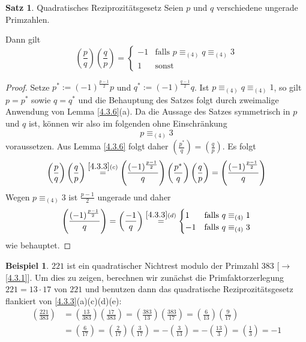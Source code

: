 \documentclass[
twoside=semi,
fontsize=12,
DIV=12, 
cleardoublepage=current,
leqno,
headings=optiontoheadandtoc, 
toc=idx
]{scrbook}
\newcommand{\brac}[1]{\left( #1 \right)}
\newcommand{\legendre}[2]{\brac{\frac{#1}{#2}}}
\theoremstyle{definition}
\newtheorem{beispiel}[definition]{Beispiel}
\newtheorem{satz}[definition]{Satz}
\begin{document}
 	\begin{satz}\label{4.3.7} Quadratisches Reziprozit\"atsgesetz\newline
 		Seien $p$ und $q$ verschiedene ungerade Primzahlen.
 		
 		\medskip\noindent
 		Dann gilt 
 		\[\legendre{p}{q}\legendre{q}{p} = 
 		\begin{cases}
 			-1 & \textrm{falls } p \equiv_{(4)} q \equiv_{(4)} 3\\
 			1 & \textrm{sonst}
 		\end{cases}\]
 		
 		\begin{proof}
 			Setze $p^* := (-1)^{\frac{p-1}{2}} p$ und $q^* := (-1)^{\frac{q-1}{2}}q$. Ist $p \equiv_{(4)} q \equiv_{(4)} 1$, so gilt $p = p^*$ sowie $q = q^*$ und die Behauptung
 			des Satzes folgt durch zweimalige Anwendung von Lemma \ref{4.3.6}(a). Da die Aussage des Satzes symmetrisch in $p$ und $q$ ist, k\"onnen wir also im folgenden ohne Einschr\"ankung
 				\[p \equiv_{(4)} 3\]
 			voraussetzen. Aus Lemma \ref{4.3.6} folgt daher $\displaystyle \legendre{p^*}{q} = \legendre{q}{p}$. Es folgt
 				\[\legendre{p}{q}\legendre{q}{p} \overset{\ref{4.3.3}(c)}{=} \legendre{(-1)^{\frac{p-1}{2}}}{q}\legendre{p^*}{q}\legendre{q}{p} = \legendre{(-1)^{\frac{p-1}{2}}}{q}\]
 			Wegen $p \equiv_{(4)} 3$ ist $\frac{p-1}{2}$ ungerade und daher 
 				\[\legendre{(-1)^{\frac{p-1}{2}}}{q} = \legendre{-1}{q} \overset{\ref{4.3.3}(d)}{=} 
 				\begin{cases}
 					1 & \textrm{falls } q \equiv_{(4)} 1\\
 					-1& \textrm{falls } q \equiv_{(4)} 3
 				\end{cases}\]
 			wie behauptet.
 		\end{proof}
 	\end{satz}
 
 	\begin{beispiel}\label{4.3.8}\hfill\newline
 		$221$ ist ein quadratischer Nichtrest modulo der Primzahl $383$ [$\to$\ref{4.3.1}]. Um dies zu zeigen, berechnen
 		wir zun\"achst die Primfaktorzerlegung $221 = 13 \cdot 17$ von $221$ und benutzen dann das quadratische Reziprozit\"atsgesetz
 		flankiert von \ref{4.3.3}(a)(c)(d)(e):
 		\begin{align*}
 			\legendre{221}{383} &= \legendre{13}{383}\legendre{17}{383} = \legendre{383}{13}\legendre{383}{17} = \legendre{6}{13}\legendre{9}{17}\\
 			&= \legendre{6}{17} = \legendre{2}{17}\legendre{3}{17} = -\legendre{3}{13} = -\legendre{13}{3} = \legendre{1}{3} = -1
 		\end{align*}
 	\end{beispiel}
\backmatter
\printindex
\end{document}
